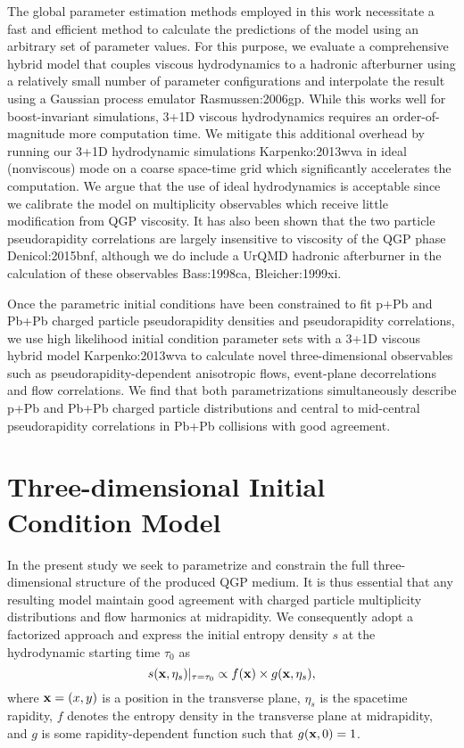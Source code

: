 The global parameter estimation methods employed in this work necessitate a fast and efficient method to calculate the predictions of the model using an arbitrary set of parameter values.
For this purpose, we evaluate a comprehensive hybrid model that couples viscous hydrodynamics to a hadronic afterburner using a relatively small number of parameter configurations and interpolate the result using a Gaussian process emulator {Rasmussen:2006gp}.
While this works well for boost-invariant simulations, 3+1D viscous hydrodynamics requires an order-of-magnitude more computation time.
We mitigate this additional overhead by running our 3+1D hydrodynamic simulations {Karpenko:2013wva} in ideal (nonviscous) mode on a coarse space-time grid which significantly accelerates the computation.
We argue that the use of ideal hydrodynamics is acceptable since we calibrate the model on multiplicity observables which receive little modification from QGP viscosity.
It has also been shown that the two particle pseudorapidity correlations are largely insensitive to viscosity of the QGP phase {Denicol:2015bnf}, although we do include a UrQMD hadronic afterburner in the calculation of these observables {Bass:1998ca, Bleicher:1999xi}.

Once the parametric initial conditions have been constrained to fit p+Pb and Pb+Pb charged particle pseudorapidity densities and pseudorapidity correlations, we use high likelihood initial condition parameter sets with a 3+1D viscous hybrid model {Karpenko:2013wva} to calculate novel three-dimensional observables such as pseudorapidity-dependent anisotropic flows, event-plane decorrelations and flow correlations.
We find that both parametrizations simultaneously describe p+Pb and Pb+Pb charged particle distributions and central to mid-central pseudorapidity correlations in Pb+Pb collisions with good agreement.


\section{Three-dimensional Initial Condition Model}

In the present study we seek to parametrize and constrain the full three-dimensional structure of the produced QGP medium.
It is thus essential that any resulting model maintain good agreement with charged particle multiplicity distributions and flow harmonics at midrapidity.
We consequently adopt a factorized approach and express the initial entropy density $s$ at the hydrodynamic starting time $\tau_0$ as
\begin{equation}
  s(\mathbf x, \eta_s)\vert_{\tau=\tau_0} \propto f(\mathbf x) \times g(\mathbf x, \eta_s),
  \label{factorized}
\end{equation}
where $\mathbf x = (x, y)$ is a position in the transverse plane, $\eta_s$ is the spacetime rapidity, $f$ denotes the entropy density in the transverse plane at midrapidity, and $g$ is some rapidity-dependent function such that $g(\mathbf x, 0)=1$.

